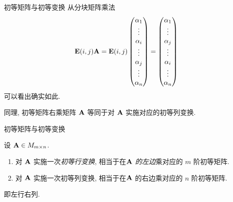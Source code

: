 \begin{frame}{初等矩阵与初等变换}
	\onslide<+->
	从分块矩阵乘法
	\[{\mathbf{E}}(i,j){\mathbf{A}}={\mathbf{E}}(i,j)\begin{pmatrix}
		\alpha_1\\
		\vdots\\
		\alpha_i\\
		\vdots\\
		\alpha_j\\
		\vdots\\
		\alpha_n
	\end{pmatrix}=\begin{pmatrix}
		\alpha_1\\
		\vdots\\
		\alpha_j\\
		\vdots\\
		\alpha_i\\
		\vdots\\
		\alpha_n
	\end{pmatrix}\]
	可以看出确实如此.

	\onslide<+->
	同理, 初等矩阵右乘矩阵 ${\mathbf{A}}$ 等同于对 ${\mathbf{A}}$ 实施对应的初等列变换.
\end{frame}


\begin{frame}{初等矩阵与初等变换}
	\onslide<+->
	\begin{theorem}
		设 ${\mathbf{A}}\in M_{m\times n}$.
		\begin{enumerate}
			\item 对 ${\mathbf{A}}$ 实施一次\emph{初等行变换}, 相当于在\emph{${\mathbf{A}}$ 的左边}乘对应的 $m$ 阶初等矩阵.
			\item 对 ${\mathbf{A}}$ 实施一次\alert{初等列变换}, 相当于在\alert{${\mathbf{A}}$ 的右边}乘对应的 $n$ 阶初等矩阵.
		\end{enumerate}
	\end{theorem}
	\onslide<+->
	即\alert{左行右列}.
\end{frame}


